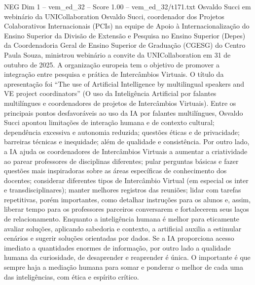 \begin{textsample}{NEG Dim 1 – vem\_ed\_32 – Score 1.00 – vem\_ed\_32/t171.txt}  \label{ex:f1_neg_034}
Osvaldo Succi em webinário da UNICollaboration Osvaldo Succi, coordenador dos Projetos Colaborativos Internacionais (PCIs) na equipe de Apoio à Internacionalização do Ensino Superior da Divisão de Extensão e Pesquisa no Ensino Superior (Depes) da Coordenadoria Geral de Ensino Superior de Graduação (CGESG) do Centro Paula Souza, ministrou webinário a convite da UNICollaboration em 31 de outubro de 2025.
A organização europeia tem o objetivo de promover a integração entre pesquisa e prática de Intercâmbios Virtuais.
O título da apresentação foi “The use of Artificial Intelligence by multilingual speakers and VE project coordinators” (O uso da Inteligência Artificial por falantes multilíngues e coordenadores de projetos de Intercâmbios Virtuais).
Entre os principais pontos desfavoráveis ao uso da IA por falantes multilíngues, Osvaldo Succi apontou limitações de interação humana e de contexto cultural; dependência excessiva e autonomia reduzida; questões éticas e de privacidade; barreiras técnicas e inequidade; além de qualidade e consistência.
Por outro lado, a IA ajuda os coordenadores de Intercâmbios Virtuais a aumentar a criatividade ao parear professores de disciplinas diferentes; pular perguntas básicas e fazer questões mais inspiradoras sobre as áreas específicas de conhecimento dos docentes; considerar diferentes tipos de Intercâmbio Virtual (em especial os inter e transdisciplinares); manter melhores registros das reuniões; lidar com tarefas repetitivas, porém importantes, como detalhar instruções para os alunos e, assim, liberar tempo para os professores parceiros conversarem e fortalecerem seus laços de relacionamento.
Enquanto a inteligência humana é melhor para eticamente avaliar soluções, aplicando sabedoria e contexto, a artificial auxilia a estimular cenários e sugerir soluções orientadas por dados.
Se a IA proporciona acesso imediato a quantidades enormes de informação, por outro lado a qualidade humana da curiosidade, de desaprender e reaprender é única.
O importante é que sempre haja a mediação humana para somar e ponderar o melhor de cada uma das inteligências, com ética e espírito crítico.

\end{textsample}
